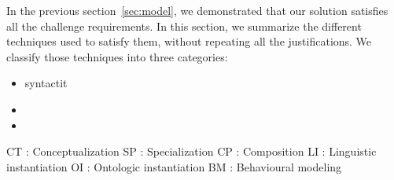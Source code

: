
In the previous section~\ref{sec:model}, we demonstrated that our solution satisfies all the challenge
requirements. In this section, we summarize the different techniques used to satisfy them, without repeating
all the justifications. We classify those techniques into three categories: 
\begin{itemize}
    \item syntactit
    \item 
    \item 
\end{itemize}







CT : Conceptualization
SP : Specialization
CP : Composition
LI : Linguistic instantiation
OI : Ontologic instantiation
BM : Behavioural modeling


